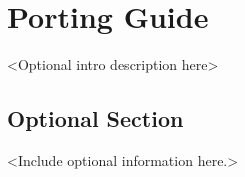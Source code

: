 %


\chapter{Porting Guide} %

<Optional intro description here>

\section{Optional Section}

<Include optional information here.>

